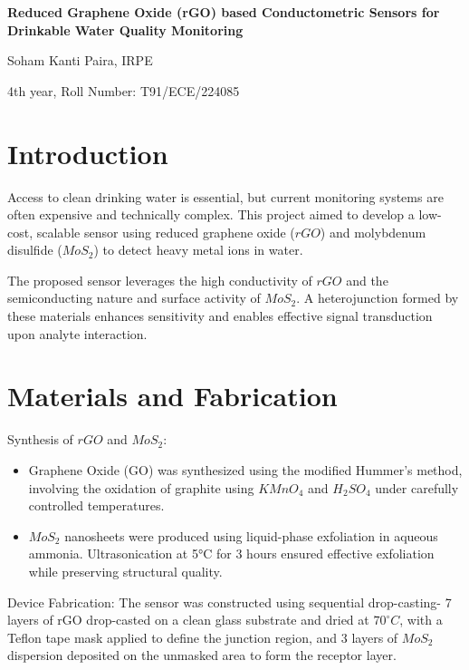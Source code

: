 \documentclass[11pt,a5paper]{article}
\newcommand{\papertitle}[1]{%
    \begin{center}
        {\fontsize{14}{16}\selectfont \textbf{#1}\par}
    \end{center}
}
\newcommand{\paperauthor}[2]{%
    \begin{center}
        {\fontsize{11}{13}\selectfont #1, #2\par}
    \end{center}
}
\newcommand{\paperyearroll}[2]{%
    \begin{center}
        {\fontsize{11}{13}\selectfont #1, #2\par}
    \end{center}
}
\begin{document}
\singlespacing

\papertitle{Reduced Graphene Oxide (rGO) based
Conductometric Sensors for Drinkable Water
Quality Monitoring}

\paperauthor{Soham Kanti Paira}{IRPE}
\vspace{-2em}
\paperyearroll{4th year}{Roll Number: T91/ECE/224085}

\justifying
\vspace{-1.5em}
\section{Introduction}
Access to clean drinking water is essential, but current monitoring systems are often expensive and technically complex. 
This project aimed to develop a low-cost, scalable sensor using reduced graphene oxide ($rGO$) and molybdenum disulfide 
($MoS_{2}$) to detect heavy metal ions in water.

The proposed sensor leverages the high conductivity of $rGO$ and the semiconducting nature and surface activity 
of $MoS_{2}$. 
A heterojunction formed by these materials enhances sensitivity and enables effective signal transduction 
upon analyte interaction.


\vspace{-1.5em}
\section{Materials and Fabrication}
Synthesis of $rGO$ and $MoS_{2}$:
\vspace{-0.5em}
\begin{itemize}[itemsep=0pt]
    \item Graphene Oxide (GO) was synthesized using the modified Hummer’s method,
    involving the oxidation of graphite using $KMnO_{4}$ and $H_{2}SO_{4}$ under carefully controlled temperatures. 
    \item $MoS_{2}$ nanosheets were produced using liquid-phase exfoliation in aqueous ammonia. 
    Ultrasonication at 5°C for 3 hours ensured effective exfoliation while preserving structural quality.
\end{itemize}

Device Fabrication:
The sensor was constructed using sequential drop-casting- 7 layers of rGO drop-casted 
on a clean glass substrate and dried at $70^{\circ}C$, with a Teflon tape mask applied to define the junction region,
and 3 layers of $MoS_{2}$ dispersion deposited on the unmasked area to form the receptor layer.
\end{document}
